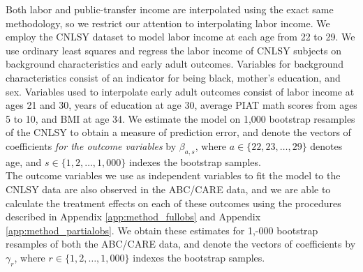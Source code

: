 \noindent Both labor and public-transfer income are interpolated using the exact same methodology, so we restrict
our attention to interpolating labor income. We employ the CNLSY dataset to model labor
income at each age from 22 to 29. We use ordinary least squares and regress the labor income of
CNLSY subjects on background characteristics and early adult outcomes. Variables for background
characteristics consist of an indicator for being  black, mother's education, and sex. Variables
used to interpolate early adult outcomes consist of labor income at ages 21 and 30, years of education at age 30, average
PIAT math scores from ages 5 to 10, and BMI at age 34. We estimate the model on 1,000 bootstrap
resamples of the CNLSY to obtain a measure of prediction error, and denote the vectors of coefficients
\emph{for the outcome variables} by $\beta_{a,s}$, where $a \in \{22, 23, \dots, 29\}$ denotes age, and
$s \in \{1,2,\dots, 1,000\}$ indexes the bootstrap samples. \\




\noindent The outcome variables we use as independent variables to fit the model to the CNLSY data are also
observed in the ABC/CARE data, and we are able to calculate the treatment effects on each of these outcomes
using the procedures described in Appendix \ref{app:method_fullobs} and Appendix \ref{app:method_partialobs}. We
obtain these estimates for 1,-000 bootstrap resamples of both the ABC/CARE data, and denote the vectors of
coefficients by $\gamma_r$, where $r \in \{1,2,\dots,1,000\}$ indexes the bootstrap samples. \\

